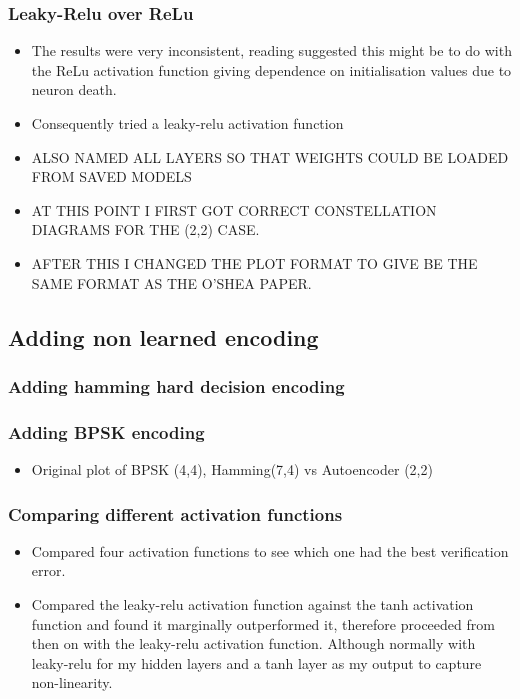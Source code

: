 \documentclass[12pt,onecolumn,letterpaper]{article}
\begin{document}
\subsubsection{Leaky-Relu over ReLu}

\begin{itemize}
   \item The results were very inconsistent, reading suggested this might be to do with the ReLu activation function giving dependence on initialisation values due to neuron death.
   \item Consequently tried a leaky-relu activation function
   \item ALSO NAMED ALL LAYERS SO THAT WEIGHTS COULD BE LOADED FROM SAVED MODELS 
   \item AT THIS POINT I FIRST GOT CORRECT CONSTELLATION DIAGRAMS FOR THE (2,2) CASE.
   \item AFTER THIS I CHANGED THE PLOT FORMAT TO GIVE BE THE SAME FORMAT AS THE O'SHEA PAPER.
\end{itemize}

\subsection{Adding non learned encoding}


\subsubsection{Adding hamming hard decision encoding}


\subsubsection{Adding BPSK encoding}

\begin{itemize}
   \item Original plot of BPSK (4,4), Hamming(7,4) vs Autoencoder (2,2) 
\end{itemize}


\subsubsection{Comparing different activation functions}

\begin{itemize}
   \item Compared four activation functions to see which one had the best verification error.
   \item Compared the leaky-relu activation function against the tanh activation function and found it marginally outperformed it, therefore proceeded from then on with the leaky-relu activation function. Although normally with leaky-relu for my hidden layers and a tanh layer as my output to capture non-linearity.
\end{itemize}
\end{document}
